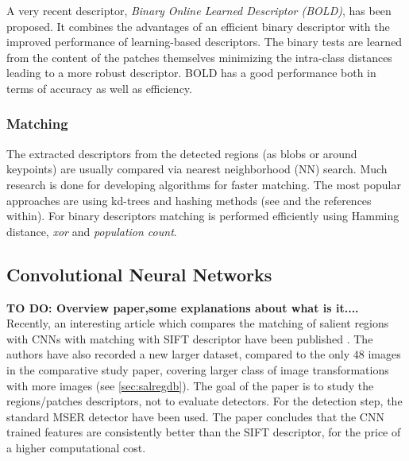 A very recent descriptor, {\em Binary Online Learned Descriptor (BOLD)}, \cite{Balntas_2015_CVPR} has been proposed. It combines the advantages of an efficient binary descriptor with the improved performance of learning-based descriptors. The binary tests are learned from the content of the patches themselves minimizing the intra-class distances leading to a more robust descriptor. BOLD has a good performance both in terms of accuracy as well as efficiency.

\subsubsection{Matching}
The extracted descriptors from the detected regions (as blobs or around keypoints) are usually compared via nearest neighborhood (NN) search. Much research is done for developing algorithms for faster matching. The most popular approaches are using kd-trees and hashing methods (see \cite{conf:icpr:MiksikM12} and the references within). For binary descriptors matching is performed efficiently using Hamming distance, {\em xor} and {\em population count}.


\subsection{Convolutional Neural Networks}

{\bf TO DO: Overview paper,some explanations about what is it....}
Recently, an interesting article which compares the matching of salient regions  with CNNs with matching with SIFT descriptor have been published \cite{FischerDB14}. The authors have also recorded a new larger dataset, compared to the only $48$ images in the comparative study paper, covering larger class of image transformations with more images (see \ref{sec:salregdb}). The goal of the paper is to study the regions/patches descriptors, not to evaluate detectors. For the detection step, the standard MSER detector have been used. The paper concludes that the CNN trained features are consistently better than the SIFT descriptor, for the price of a higher computational cost.

